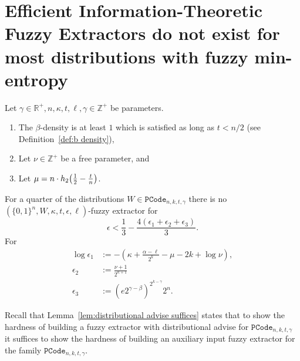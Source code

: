 

\section{Efficient Information-Theoretic Fuzzy Extractors do not exist for most distributions with fuzzy min-entropy}
\label{sec:fe}


\begin{theorem}
Let $\gamma \in\mathbb{R}^+, n, \kappa, t, \ell, \gamma \in\mathbb{Z}^+$ be parameters. 
\begin{enumerate}
\itemsep0em
\item The $\beta$-density is at least $1$ which is  satisfied as long as $t< n/2 $ (see Definition~\ref{def:b density}),
\item Let $\nu \in \mathbb{Z}^+$ be a free parameter, and
\item Let $\mu =  n \cdot h_2\!\left(\frac{1}{2} - \frac{t}{n}\right)$.
\end{enumerate}
For a quarter of the distributions $W\in \mathtt{PCode}_{n, k, t, \gamma}$ there is no $(\{0,1\}^n, W, \kappa, t, \epsilon, \ell)$-fuzzy extractor for 
\[
\epsilon< \frac{1}{3} - \frac{4(\epsilon_1+\epsilon_2+\epsilon_3)}{3}.
\]
For 
\begin{align*}\log{\epsilon_1}&:= -\left(\kappa+\frac{\alpha -\ell}{2^k} - \mu -2k+\log{\nu}\right),\\
\epsilon_2&:=\frac{\nu+1}{2^{\kappa+1}}\\
\epsilon_3&:=\left(e2^{\gamma-\beta}\right)^{2^{k-\gamma}}2^n.
\end{align*}
\label{thm:main theorem}
\end{theorem}

Recall that Lemma~\ref{lem:distributional advise suffices} states that to show the hardness of building a fuzzy extractor with distributional advise for $\mathtt{PCode}_{n, k, t, \gamma}$ it suffices to show the hardness of building an auxiliary input fuzzy extractor for the family $\mathtt{PCode}_{n, k, t, \gamma}$. 

